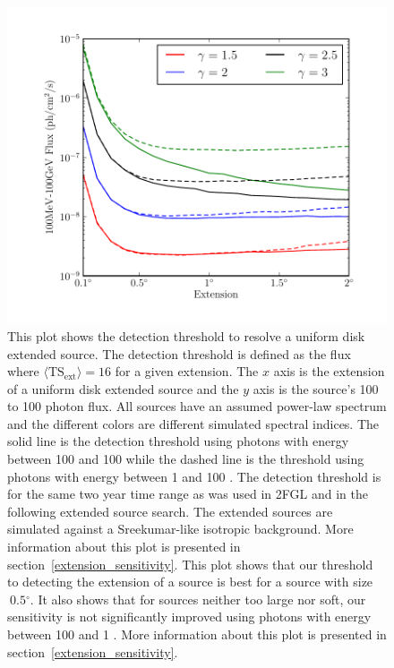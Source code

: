 \documentclass[12pt,preprint]{aastex}
\newcommand{\mev}{\text{MeV}\xspace}
\newcommand{\gev}{\text{GeV}\xspace}
\newcommand{\tsext}{{\ensuremath{\text{TS}_{\text{ext}}}}\xspace}
\renewcommand{\deg}{\ensuremath{^\circ}\xspace}
\begin{document}
\clearpage

\begin{figure}
  \begin{center}
    \includegraphics{mc_plots/index_sensitivity.pdf}
    \end{center}
    \caption{
    This plot shows the detection threshold to resolve a uniform
    disk extended source.  The detection threshold is defined as the flux where
    $\langle\tsext\rangle=16$ for a given extension.  The $x$ axis is
    the extension of a uniform disk extended source and the $y$ axis
    is the source's 100 \mev to 100 \gev photon flux.  All sources have
    an assumed power-law spectrum and the different colors are different
    simulated spectral indices.  The solid line is the detection threshold
    using photons with energy between 100 \mev and 100 \gev while the
    dashed line is the threshold using photons with energy between 1 \gev
    and 100 \gev.  The detection threshold is for the same two year time
    range as was used in 2FGL and in the following extended source search.
    The extended sources are simulated against
  a Sreekumar-like isotropic background.  More information
    about this plot is presented in section~\ref{extension_sensitivity}.
    This plot shows that our threshold to detecting the extension of
    a source is best for a source with size $~0.5\deg$. It also shows
    that for sources neither too large nor soft, our sensitivity is not
    significantly improved using photons with energy between 100 \mev
    and 1 \gev. More information about this plot is presented
    in section~\ref{extension_sensitivity}.
    }\label{index_sensitivity}
  \end{figure}
\end{document}
